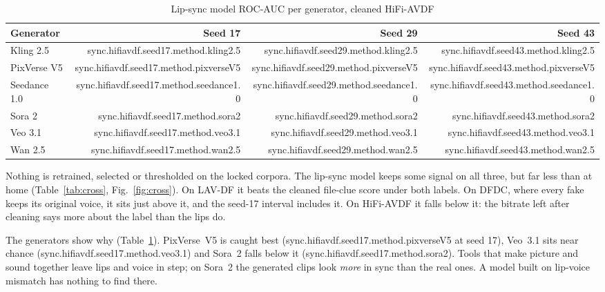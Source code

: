 \documentclass[conference]{IEEEtran}
\begin{document}
\begin{table}[htbp]
\caption{Lip-sync model ROC-AUC per generator, cleaned HiFi-AVDF}
\label{tab:generators}
\centering
\begin{tabular}{lrrr}
\toprule
Generator & Seed 17 & Seed 29 & Seed 43 \\
\midrule
Kling 2.5 & {{sync.hifiavdf.seed17.method.kling2.5}} & {{sync.hifiavdf.seed29.method.kling2.5}} & {{sync.hifiavdf.seed43.method.kling2.5}} \\
PixVerse V5 & {{sync.hifiavdf.seed17.method.pixverseV5}} & {{sync.hifiavdf.seed29.method.pixverseV5}} & {{sync.hifiavdf.seed43.method.pixverseV5}} \\
Seedance 1.0 & {{sync.hifiavdf.seed17.method.seedance1.0}} & {{sync.hifiavdf.seed29.method.seedance1.0}} & {{sync.hifiavdf.seed43.method.seedance1.0}} \\
Sora 2 & {{sync.hifiavdf.seed17.method.sora2}} & {{sync.hifiavdf.seed29.method.sora2}} & {{sync.hifiavdf.seed43.method.sora2}} \\
Veo 3.1 & {{sync.hifiavdf.seed17.method.veo3.1}} & {{sync.hifiavdf.seed29.method.veo3.1}} & {{sync.hifiavdf.seed43.method.veo3.1}} \\
Wan 2.5 & {{sync.hifiavdf.seed17.method.wan2.5}} & {{sync.hifiavdf.seed29.method.wan2.5}} & {{sync.hifiavdf.seed43.method.wan2.5}} \\
\bottomrule
\end{tabular}
\end{table}

Nothing is retrained, selected or thresholded on the locked corpora. The lip-sync model
keeps some signal on all three, but far less than at home
(Table~\ref{tab:cross}, Fig.~\ref{fig:cross}). On LAV-DF it beats the cleaned
file-clue score under both labels. On DFDC, where every fake keeps its original
voice, it sits just above it, and the seed-17 interval includes it. On HiFi-AVDF
it falls below it: the bitrate left after cleaning says more about the label
than the lips do.

The generators show why (Table~\ref{tab:generators}). PixVerse~V5 is caught
best ({{sync.hifiavdf.seed17.method.pixverseV5}} at seed 17), Veo~3.1 sits near
chance ({{sync.hifiavdf.seed17.method.veo3.1}}) and Sora~2 falls below it
({{sync.hifiavdf.seed17.method.sora2}}). Tools that make picture and sound
together leave lips and voice in step; on Sora~2 the generated clips look
\emph{more} in sync than the real ones. A model built on lip-voice mismatch has
nothing to find there.
\end{document}
